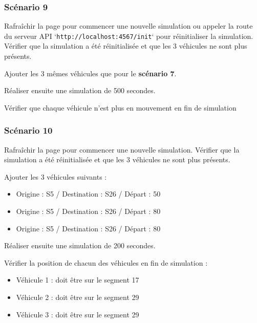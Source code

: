 \documentclass[11pt,a4paper,oneside]{article}
\begin{document}
\subsubsection{Scénario 9}

Rafraîchir la page pour commencer une nouvelle simulation ou appeler la route du serveur API `\texttt{http://localhost:4567/init}` pour réinitialiser la simulation. Vérifier que la simulation a été réinitialisée et que les 3 véhicules ne sont plus présents.

\vspace{2mm}
Ajouter les 3 mêmes véhicules que pour le \textbf{scénario 7}.

\vspace{2mm}
Réaliser ensuite une simulation de 500 secondes.

\vspace{2mm}
Vérifier que chaque véhicule n'est plus en mouvement en fin de simulation

\subsubsection{Scénario 10}

Rafraîchir la page pour commencer une nouvelle simulation. Vérifier que la simulation a été réinitialisée et que les 3 véhicules ne sont plus présents.

\vspace{2mm}
Ajouter les 3 véhicules suivants :
\begin{itemize}
	\item Origine : S5 / Destination : S26 / Départ : 50
	\item Origine : S5 / Destination : S26 / Départ : 80
	\item Origine : S5 / Destination : S26 / Départ : 80
\end{itemize}

\vspace{2mm}
Réaliser ensuite une simulation de 200 secondes.

\vspace{2mm}
Vérifier la position de chacun des véhicules en fin de simulation :
\begin{itemize}
	\item Véhicule 1 : doit être sur le segment 17
	\item Véhicule 2 : doit être sur le segment 29
	\item Véhicule 3 : doit être sur le segment 29
\end{itemize}
\end{document}
